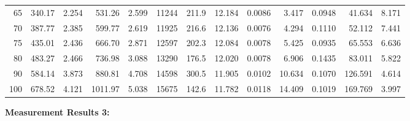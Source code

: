 \documentclass[10pt]{article}
\begin{document}
{\begin{tabular}{|r|rr|rr|rr|rr|rr|r|r|}
       65 &       340.17 &        2.254 &       531.26 &        2.599 &        11244 &        211.9 &       12.184 &       0.0086 &        3.417 &       0.0948 &       41.634 &        8.171 \\
       70 &       387.77 &        2.385 &       599.77 &        2.619 &        11925 &        216.6 &       12.136 &       0.0076 &        4.294 &       0.1110 &       52.112 &        7.441 \\
       75 &       435.01 &        2.436 &       666.70 &        2.871 &        12597 &        202.3 &       12.084 &       0.0078 &        5.425 &       0.0935 &       65.553 &        6.636 \\
       80 &       483.27 &        2.466 &       736.98 &        3.088 &        13290 &        176.5 &       12.020 &       0.0078 &        6.906 &       0.1435 &       83.011 &        5.822 \\
       90 &       584.14 &        3.873 &       880.81 &        4.708 &        14598 &        300.5 &       11.905 &       0.0102 &       10.634 &       0.1070 &      126.591 &        4.614 \\
      100 &       678.52 &        4.121 &      1011.97 &        5.038 &        15675 &        142.6 &       11.782 &       0.0118 &       14.409 &       0.1019 &      169.769 &        3.997 \\
\hline
\end{tabular}
}

\vspace{3mm}

\noindent
{\large \bf Measurement Results 3:}
\vspace{3mm}
\end{document}
